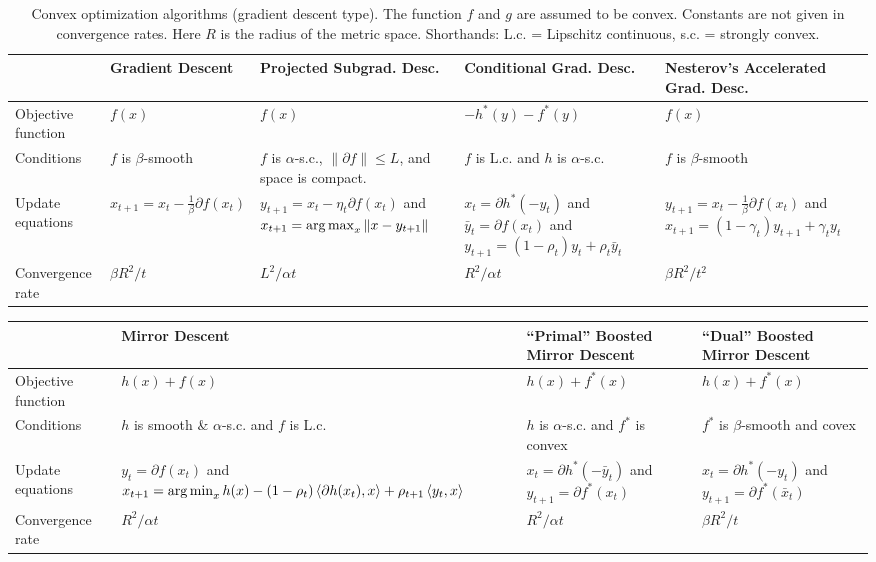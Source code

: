 \documentclass[reqno,oneside,a4paper]{amsart}
\newcommand{\ip}[2]{\left\langle #1, #2 \right\rangle}
\begin{document}
\begin{landscape}

\begin{table}[htdp]
\begin{center}
\begin{tabular}{|l|p{4.05cm}|p{4.05cm}|p{4.05cm}|p{4.05cm}|}
\hline & Gradient Descent & Projected Subgrad. Desc. & Conditional Grad. Desc. & Nesterov's Accelerated Grad. Desc.   \\ 
\hline
Objective function  &
$f(x)$ &
$f(x)$ &
$-h^{*}(y) - f^{*}(y)$ &
$f(x)$ \\
\hline
Conditions & 
$f$ is $\beta$-smooth &
$f$ is $\alpha$-s.c., $\|\partial f\| \le L$, and space is compact. & 
$f$ is L.c. and $h$ is $\alpha$-s.c. &
$f$ is $\beta$-smooth \\
\hline
Update equations &
$x_{t+1} = x_{t} - \frac{1}{\beta}\partial f(x_{t})$ &
$y_{t+1} = x_{t} - \eta_{t}\partial f(x_{t})$ and $x_{t+1} = \argmax_{x} \| x - y_{t+1} \|$ &
$x_{t} = \partial h^{*}(-y_{t})$ and $\bar y_{t} = \partial f(x_{t})$ and $y_{t+1} = (1 - \rho_{t})y_{t} + \rho_{t} \bar y_{t}$&
$y_{t+1} = x_{t} - \frac{1}{\beta}\partial f(x_{t})$ and $x_{t+1} = (1- \gamma_{t})y_{t+1} + \gamma_{t}y_{t}$ \\
\hline
Convergence rate &
$\beta R^{2}/t$ &
$L^{2} / \alpha t$ &
$R^{2} / \alpha t$ &
$\beta R^{2}/t^{2}$ \\
\hline
\end{tabular}
\caption{Convex optimization algorithms (gradient descent type). The function $f$ and $g$ are assumed to be convex. Constants are not given in convergence rates. Here $R$ is the radius of the metric space. Shorthands: L.c. = Lipschitz continuous, s.c. = strongly convex. }
\label{table:gd-convex-opt-algs}
\end{center}
\end{table}

\begin{table}[htdp]
\begin{center}
\begin{tabular}{|l|p{5.5cm}|p{5.5cm}|p{5.5cm}|}
\hline & Mirror Descent & ``Primal'' Boosted Mirror Descent & ``Dual'' Boosted Mirror Descent  \\ 
\hline
Objective function & 
$h(x) + f(x)$ & 
$h(x) + f^{*}(x)$ & 
$h(x) + f^{*}(x)$ \\
\hline
Conditions & 
$h$ is smooth \& $\alpha$-s.c. and $f$ is L.c. & 
$h$ is $\alpha$-s.c. and $f^{*}$ is convex& 
$f^{*}$ is $\beta$-smooth and covex \\
\hline
Update equations & 
$y_{t} = \partial f(x_{t})$ and 
$x_{t+1} = \argmin_{x} h(x) - (1 - \rho_{t})\ip{\partial h(x_{t})}{x} + \rho_{t+1}\ip{y_{t}}{x}$ &
$x_{t} = \partial h^{*}(-\bar y_{t})$ and $y_{t+1} = \partial f^{*}(x_{t})$ & 
$x_{t} = \partial h^{*}(-y_{t})$ and $y_{t+1} = \partial f^{*}(\bar x_{t})$ \\
\hline
Convergence rate & 
$R^{2}/\alpha t$ & 
$R^{2}/\alpha t$ & 
$\beta R^{2} / t$ \\
\hline


\end{tabular}
\end{center}
\end{table}
\end{landscape}
\end{document}
